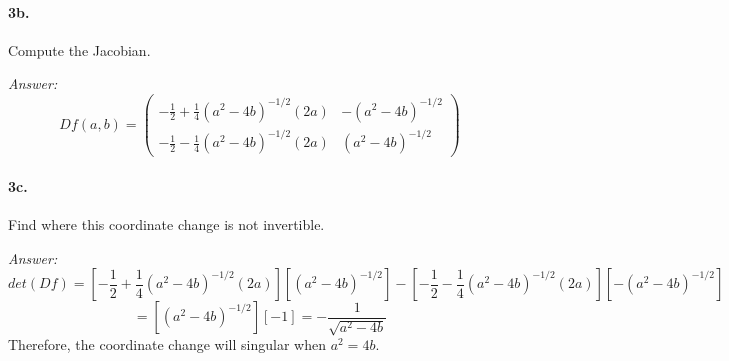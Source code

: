 \documentclass[10pt,a4paper]{article}
\begin{document}
\paragraph{3b.} Compute the Jacobian.
\begin{flushleft}
\textit{Answer:}\\
$$Df(a,b) = 
\begin{pmatrix}
-\frac{1}{2}+\frac{1}{4}(a^2-4b)^{-1/2}(2a) & -(a^2-4b)^{-1/2}\\
-\frac{1}{2}-\frac{1}{4}(a^2-4b)^{-1/2}(2a) & (a^2-4b)^{-1/2}
\end{pmatrix}$$
\end{flushleft}

\paragraph{3c.} Find where this coordinate change is not invertible.
\begin{flushleft}
\textit{Answer:}\\
$$ det(Df) = \left[ -\frac{1}{2}+\frac{1}{4}(a^2-4b)^{-1/2}(2a) \right]\left[ (a^2-4b)^{-1/2}\right] - \left[ -\frac{1}{2}-\frac{1}{4}(a^2-4b)^{-1/2}(2a)\right]\left[ -(a^2-4b)^{-1/2}\right]$$
$$  = \left[ (a^2-4b)^{-1/2}\right]\left[ -1\right] = -\frac{1}{\sqrt{a^2-4b}}$$
Therefore, the coordinate change will singular when $a^2 = 4b$.
\end{flushleft}
\end{document}
